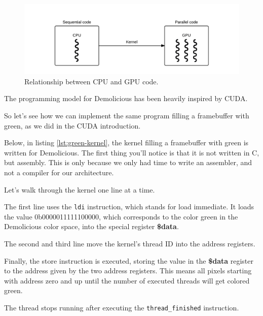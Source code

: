 \documentclass[../main/report.tex]{subfiles}
\begin{document}
\begin{figure}[H]
	\centering
	\includegraphics[width=\textwidth]{../system_overview/diagrams/programming_model_cpu_gpu.png}
	\caption{Relationship between CPU and GPU code.}
	\label{fig:programming_model_cpu_gpu}
\end{figure}

The programming model for Demolicious has been heavily inspired by CUDA. 

So let's see how we can implement the same program filling a framebuffer with green, as we did in the CUDA introduction.

Below, in listing \ref{lst:green-kernel}, the kernel filling a framebuffer with green is written for Demolicious.
The first thing you'll notice is that it is not written in C, but assembly.
This is only because we only had time to write an assembler, and not a compiler for our architecture.



Let's walk through the kernel one line at a time.

The first line uses the \verb/ldi/ instruction, which stands for load immediate.
It loads the value 0b0000011111100000,
which corresponds to the color green in the Demolicious color space,
into the special register \textbf{\$data}.

The second and third line move the kernel's thread ID into the address registers.

Finally, the store instruction is executed, storing the value in the \textbf{\$data} register
to the address given by the two address registers.
This means all pixels starting with address zero and up until the number of executed threads
will get colored green.

The thread stops running after executing the \verb/thread_finished/ instruction.
\\
\end{document}
